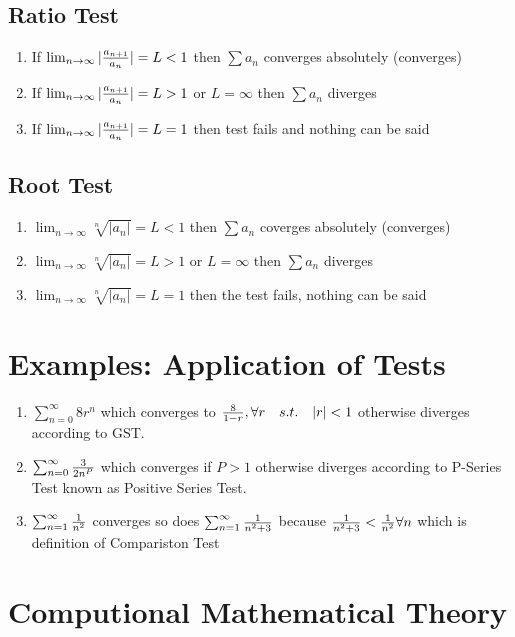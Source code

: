 \documentclass[12pt]{article}
\begin{document}
\subsection{Ratio Test}
\begin{enumerate}
\item If $\lim_{n \to \infty} |{a_{n+1} \over a_n}| = L < 1$ then $\sum a_n$ converges absolutely (converges)
\item If $\lim_{n \to \infty} |{a_{n+1} \over a_n}| = L > 1$ or $L = \infty$ then $\sum a_n$ diverges
\item If $\lim_{n \to \infty} |{a_{n+1} \over a_n}| = L = 1$ then test fails and nothing can be said
\end{enumerate}

\subsection{Root Test}
\begin{enumerate}
\item $\lim_{n \to \infty} \sqrt[n]{|a_n|} = L < 1$ then $\sum a_n$ coverges absolutely (converges)
\item $\lim_{n \to \infty} \sqrt[n]{|a_n|} = L > 1$ or $L = \infty$ then $\sum a_n$ diverges
\item $\lim_{n \to \infty} \sqrt[n]{|a_n|} = L = 1$ then the test fails, nothing can be said
\end{enumerate}

\section{Examples: Application of Tests}
\begin{enumerate}
\item $\sum_{n=0}^{\infty}8r^{n}$ which converges to ${8 \over 1-r}, \forall r  \quad s.t. \quad |r|<1$ otherwise diverges according to GST.
\item $\sum_{n=0}^{\infty}{3\over 2n^P}$ which converges if $P>1$ otherwise diverges according to P-Series Test known as Positive Series Test.
\item $\sum_{n=1}^{\infty}{1 \over n^2}$ converges so does $\sum_{n=1}^{\infty}{1 \over n^2+3}$ because ${1 \over n^2+3} < {1 \over n^2} \forall n$ which is definition of Compariston Test
\end{enumerate}

\section{Computional Mathematical Theory}
\end{document}
